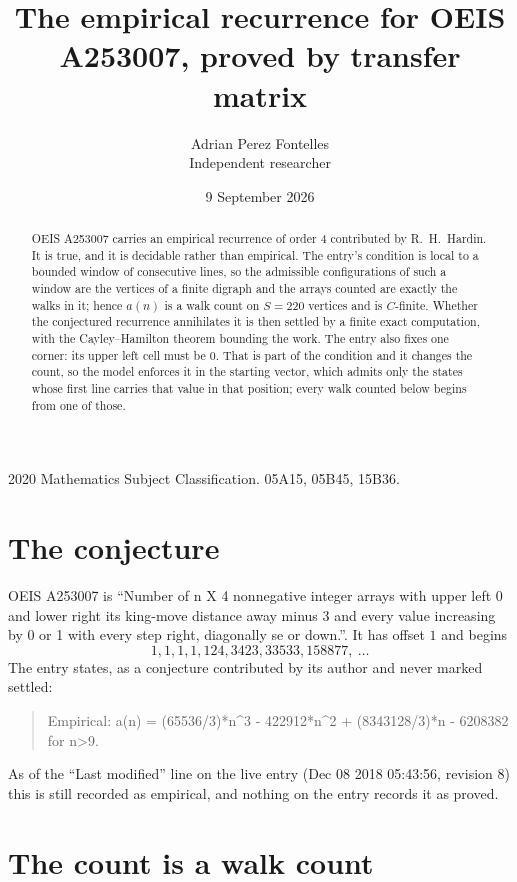 \documentclass[11pt,a4paper]{article}
\title{The empirical recurrence for OEIS A253007, proved by transfer matrix}
\author{Adrian Perez Fontelles\\ \small Independent researcher}
\date{9 September 2026}
\theoremstyle{plain}
\theoremstyle{definition}
\begin{document}
\maketitle

\begin{abstract}
OEIS A253007 carries an empirical recurrence of order $4$ contributed by R.~H.~Hardin. It is
true, and it is decidable rather than empirical. The entry's condition is local to a bounded window of consecutive lines, so
the admissible configurations of such a window are the vertices of a finite digraph and the
arrays counted are exactly the walks in it; hence $a(n)$ is a walk count on $S=220$ vertices
and is $C$-finite. Whether the conjectured recurrence annihilates it is then settled by a
finite exact computation, with the Cayley--Hamilton theorem bounding the work.
 The entry also fixes one corner: its upper left cell must be $0$. That is part of the condition and it changes the count, so the model enforces it in the starting vector, which admits only the states whose first line carries that value in that position; every walk counted below begins from one of those.\end{abstract}

\noindent\small 2020 Mathematics Subject Classification. 05A15, 05B45, 15B36.\normalsize

\section{The conjecture}

OEIS A253007 is ``Number of n X 4 nonnegative integer arrays with upper left 0 and lower right its king-move distance away minus 3 and every value increasing by 0 or 1 with every step right, diagonally se or down.''. It has offset $1$ and begins
\[
1, 1, 1, 1, 124, 3423, 33533, 158877,\ \dots
\]
The entry states, as a conjecture contributed by its author and never marked settled:
\begin{quote}
Empirical: a(n) = (65536/3)*n\^{}3 - 422912*n\^{}2 + (8343128/3)*n - 6208382 for n>9.
\end{quote}
As of the ``Last modified'' line on the live entry (Dec 08 2018 05:43:56, revision 8) this is still
recorded as empirical, and nothing on the entry records it as proved.

\section{The count is a walk count}
\end{document}
